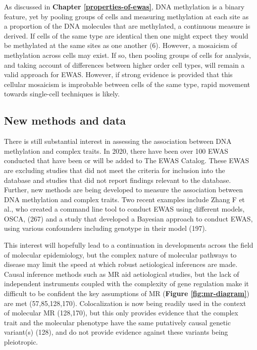 \documentclass[11pt,twoside]{bristolthesis}
\begin{document}
As discussed in \textbf{Chapter \ref{properties-of-ewas}}, DNA methylation is a binary feature, yet by pooling groups of cells and measuring methylation at each site as a proportion of the DNA molecules that are methylated, a continuous measure is derived. If cells of the same type are identical then one might expect they would be methylated at the same sites as one another (6). However, a mosaicism of methylation across cells may exist. If so, then pooling groups of cells for analysis, and taking account of differences between higher order cell types, will remain a valid approach for EWAS. However, if strong evidence is provided that this cellular mosaicism is improbable between cells of the same type, rapid movement towards single-cell techniques is likely.

\hypertarget{new-methods-and-data}{%
\subsection{New methods and data}\label{new-methods-and-data}}

There is still substantial interest in assessing the association between DNA methylation and complex traits. In 2020, there have been over 100 EWAS conducted that have been or will be added to The EWAS Catalog. These EWAS are excluding studies that did not meet the criteria for inclusion into the database and studies that did not report findings relevant to the database. Further, new methods are being developed to measure the association between DNA methylation and complex traits. Two recent examples include Zhang F et al., who created a command line tool to conduct EWAS using different models, OSCA, (267) and a study that developed a Bayesian approach to conduct EWAS, using various confounders including genotype in their model (197).

This interest will hopefully lead to a continuation in developments across the field of molecular epidemiology, but the complex nature of molecular pathways to disease may limit the speed at which robust aetiological inferences are made. Causal inference methods such as MR aid aetiological studies, but the lack of independent instruments coupled with the complexity of gene regulation make it difficult to be confident the key assumptions of MR (\textbf{Figure \ref{fig:mr-diagram}}) are met (57,85,128,170). Colocalization is now being readily used in the context of molecular MR (128,170), but this only provides evidence that the complex trait and the molecular phenotype have the same putatively causal genetic variant(s) (128), and do not provide evidence against these variants being pleiotropic.
\end{document}
